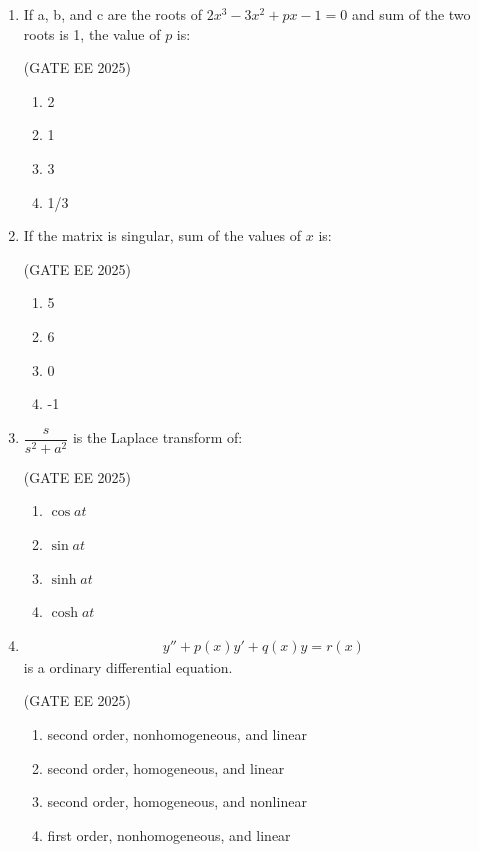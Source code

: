 \documentclass[journal,12pt,onecolumn]{IEEEtran}
\theoremstyle{remark}
\begin{document}
\begin{enumerate}
\item If a, b, and c are the roots of $2x^3 - 3x^2 + px - 1 = 0$ and sum of the two roots is 1, the value of $p$ is:

\hfill(GATE EE 2025)

\begin{multicols}{4}
\begin{enumerate}
\item 2
\item 1
\item 3
\item 1/3
\end{enumerate}
\end{multicols}

\item If the matrix  is singular, sum of the values of $x$ is:

\hfill(GATE EE 2025)

\begin{multicols}{4}
\begin{enumerate}
\item 5
\item 6
\item 0
\item -1
\end{enumerate}
\end{multicols}

\item $\dfrac{s}{s^2+a^2}$ is the Laplace transform of:

\hfill(GATE EE 2025)

\begin{multicols}{4}
\begin{enumerate}
\item $\cos at$
\item $\sin at$
\item $\sinh at$
\item $\cosh at$
\end{enumerate}
\end{multicols}

\item \begin{align*}
    y'' + p(x)y' + q(x)y = r(x)
\end{align*} is a \underline{\hspace{2cm}}ordinary differential equation.

\hfill(GATE EE 2025)

\begin{multicols}{2}
\begin{enumerate}
\item second order, nonhomogeneous, and linear
\item second order, homogeneous, and linear
\item second order, homogeneous, and nonlinear
\item first order, nonhomogeneous, and linear
\end{enumerate}
\end{multicols}


\end{enumerate}
\end{document}
